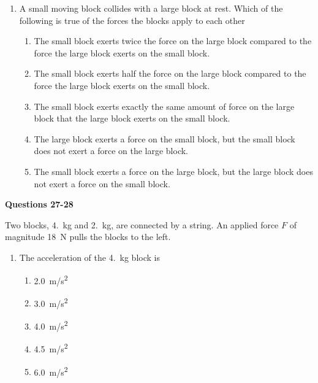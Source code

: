 \documentclass{../../oss-apphys}
\begin{document}
\begin{multicols}{2}
\begin{enumerate}[resume,leftmargin=18pt]
\item A small moving block collides with a large block at rest. Which of the
  following is true of the forces the blocks apply to each other
  \begin{enumerate}[noitemsep,topsep=0pt,leftmargin=18pt,label=(\Alph*)]
    \item The small block exerts twice the force on the large block
      compared to the force the large block exerts on the small block.
    \item The small block exerts half the force on the large block compared
      to the force the large block exerts on the small block.
    \item The small block exerts exactly the same amount of force on the
      large block that the large block exerts on the small block.
    \item The large block exerts a force on the small block, but the small
      block does not exert a force on the large block.
    \item The small block exerts a force on the large block, but the large
      block does not exert a force on the small block.
    \end{enumerate}
    
  \end{enumerate}
  
  \textbf{Questions 27-28}

  Two blocks, \SI{4.}{\kilo\gram} and \SI{2.}{\kilo\gram}, are connected by a
  string. An applied force $F$ of magnitude \SI{18}{\newton} pulls the blocks
  to the left.
  \begin{center}
  \end{center}
  
  \begin{enumerate}[resume,leftmargin=18pt]
    
  \item The acceleration of the \SI{4.}{\kilo\gram} block is
    \begin{enumerate}[noitemsep,topsep=0pt,leftmargin=18pt,label=(\Alph*)]
    \item\SI{2.0}{m/s^2}
    \item\SI{3.0}{m/s^2}
    \item\SI{4.0}{m/s^2}
    \item\SI{4.5}{m/s^2}
    \item\SI{6.0}{m/s^2}
    \end{enumerate}


\end{enumerate}
\end{multicols}
\end{document}
